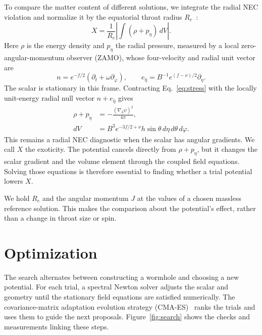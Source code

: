 \documentclass[twocolumn,floatfix,aps,prd,superscriptaddress,nofootinbib]{revtex4-2}
\begin{document}
To compare the matter content of different solutions, we integrate the radial NEC violation and normalize it by the equatorial throat radius $R_e$~\cite{visser2003,shirokov2026s}:
\begin{equation}
X=\frac{1}{R_e}\left|\int(\rho+p_\eta)\,dV\right|.
\label{eq:X}
\end{equation}
Here $\rho$ is the energy density and $p_\eta$ the radial pressure,
measured by a local zero-angular-momentum
observer (ZAMO), whose four-velocity and radial unit vector are
\begin{equation}
n=e^{-f/2}(\partial_t+\omega\partial_\varphi),\qquad
 e_{\hat\eta}=B^{-1}e^{(f-\nu)/2}\partial_\eta.
\label{eq:zamo}
\end{equation}
The scalar is stationary in this frame. Contracting Eq.~\eqref{eq:stress}
with the locally unit-energy radial null vector $n+e_{\hat\eta}$ gives
\begin{equation}
\begin{aligned}
\rho+p_\eta&=-\frac{(\nabla_{\hat\eta}\psi)^2}{4\pi},\\
dV&=B^3e^{-3f/2+\nu}h\sin\theta\,d\eta\,d\theta\,d\varphi.
\end{aligned}
\label{eq:nec-volume}
\end{equation}
This remains a radial NEC diagnostic when the scalar has angular gradients.
We call $X$ the exoticity. The potential cancels directly from $\rho+p_\eta$, but it changes the scalar gradient and the volume element through the coupled field equations. Solving those equations is therefore essential to finding whether a trial potential lowers $X$.

We hold $R_e$ and the angular momentum $J$ at the values of a chosen massless reference solution. This makes the comparison about the potential's effect, rather than a change in throat size or spin.

\section{Optimization}
\label{sec:opt}

The search alternates between constructing a wormhole and choosing a new potential. For each trial, a spectral Newton solver adjusts the scalar and geometry until the stationary field equations are satisfied numerically. The covariance-matrix adaptation evolution strategy (CMA-ES)~\cite{hansen01} ranks the trials and uses them to guide the next proposals. Figure~\ref{fig:search} shows the checks and measurements linking these steps.
\end{document}
